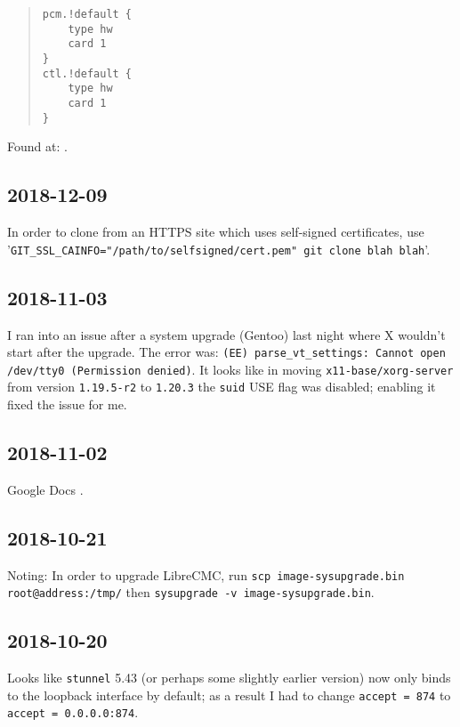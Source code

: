 \documentclass{article}
\begin{document}
\begin{quote}
\begin{verbatim}
pcm.!default {
	type hw
	card 1
}
ctl.!default {
	type hw
	card 1
}
\end{verbatim}
\end{quote}
Found at: .

\subsection{2018-12-09}
In order to clone from an HTTPS site which uses self-signed certificates, use '\texttt{GIT_SSL_CAINFO="/path/to/selfsigned/cert.pem" git clone blah blah}'.

\subsection{2018-11-03}
I ran into an issue after a system upgrade (Gentoo) last night where X wouldn't start after the upgrade.  The error was: \texttt{(EE) parse_vt_settings: Cannot open /dev/tty0 (Permission denied)}.  It looks like in moving \texttt{x11-base/xorg-server} from version \texttt{1.19.5-r2} to \texttt{1.20.3}  the \texttt{suid} USE flag was disabled; enabling it fixed the issue for me.

\subsection{2018-11-02}
Google Docs .

\subsection{2018-10-21}
Noting: In order to upgrade LibreCMC, run \texttt{scp image-sysupgrade.bin root@address:/tmp/} then \texttt{sysupgrade -v image-sysupgrade.bin}.

\subsection{2018-10-20}
Looks like \texttt{stunnel} 5.43 (or perhaps some slightly earlier version) now only binds to the loopback interface by default; as a result I had to change \texttt{accept = 874} to \texttt{accept = 0.0.0.0:874}.
\end{document}
